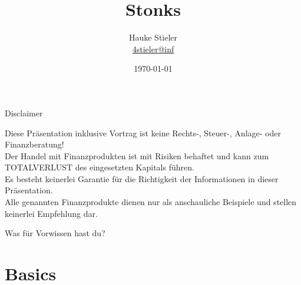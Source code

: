 \documentclass{beamer}
\author[Hauke Stieler]{Hauke Stieler\\\href{mailto:4stieler@informatik.uni-hamburg.de}{4stieler@inf}}
\title{Stonks}
\date{\today}
\newcommand{\n}{\hfill\\\vspace{0.25cm}}
\begin{document}
	{
		\maketitle
	}
	
	\begin{frame}{Disclaimer}
		\begin{center}
			Diese Präsentation inklusive Vortrag ist keine Rechts-, Steuer-, Anlage- oder Finanzberatung!\n
			Der Handel mit Finanzprodukten ist mit Risiken behaftet und kann zum TOTALVERLUST des eingesetzten Kapitals führen.\n
			Es besteht keinerlei Garantie für die Richtigkeit der Informationen in dieser Präsentation.\n
			Alle genannten Finanzprodukte dienen nur als anschauliche Beispiele und stellen keinerlei Empfehlung dar.
		\end{center}
	\end{frame}

	\begin{frame}
		\begin{center}
			Was für Vorwissen hast du?
		\end{center}
	\end{frame}

	\begin{frame}
		\tableofcontents[hidesubsections]
	\end{frame}
	
	\section{Basics}
	
\end{document}
